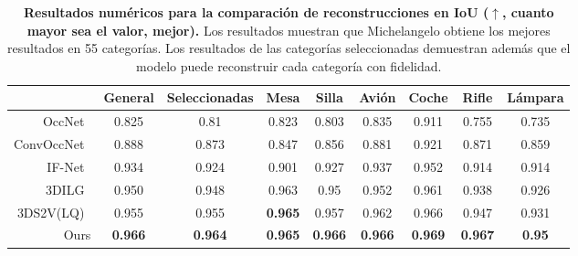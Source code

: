 \documentclass[../../book-main_es.tex]{subfiles}
\begin{document}
\begin{table}[th]
\centering
\resizebox{1\columnwidth}{!}
{
    \begin{tabular}{rcccccccc}
        \hline
        & General & Seleccionadas & Mesa & Silla & Avión & Coche & Rifle
        & Lámpara   \\ \hline
        OccNet~\cite{8953655}
        & 0.825 & 0.81 & 0.823 & 0.803 & 0.835 & 0.911 & 0.755 & 0.735  \\
        ConvOccNet~\cite{10.1007/978-3-030-58580-8_31}
        & 0.888 & 0.873 & 0.847 & 0.856 & 0.881 & 0.921 & 0.871 & 0.859  \\
        IF-Net~\cite{9156292}
        & 0.934 & 0.924 & 0.901 & 0.927 & 0.937 & 0.952 & 0.914 & 0.914 \\
        3DILG~\cite{NEURIPS2022_894ca1c4}
        & 0.950 & 0.948 & 0.963 & 0.95 & 0.952 & 0.961 & 0.938 & 0.926 \\
        3DS2V(LQ)~\cite{10.1145/3592442}
        & 0.955 & 0.955 & \textbf{0.965} & 0.957 & 0.962 & 0.966 &
        0.947 & 0.931 \\
        Ours
        & \textbf{0.966} & \textbf{0.964} & \textbf{0.965} &
        \textbf{0.966} & \textbf{0.966} & \textbf{0.969} &
        \textbf{0.967} & \textbf{0.95} \\ \hline
    \end{tabular}
}
\caption{\textbf{Resultados numéricos para la comparación de reconstrucciones en
    IoU ($\uparrow$, cuanto mayor sea el valor, mejor).} Los resultados muestran que
    Michelangelo obtiene los mejores resultados en 55 categorías. Los resultados de las
    categorías seleccionadas demuestran además que el modelo puede reconstruir cada
categoría con fidelidad.}
\label{tab:michelangelo_recon}
\end{table}
\end{document}
